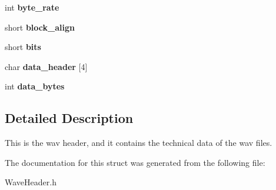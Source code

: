 \begin{DoxyCompactItemize}
\mbox{\label{structwav__header_a8330740d45200d6aee4ba54fc0d834d8}} 
int {\bfseries byte\+\_\+rate}
\item 
\mbox{\label{structwav__header_aacca1b77173a063cff26899c8fd614b7}} 
short {\bfseries block\+\_\+align}
\item 
\mbox{\label{structwav__header_a451eecf1447e3b099597004be44f43e3}} 
short {\bfseries bits}
\item 
\mbox{\label{structwav__header_ae43fac12459053e98a80e3879c5cd2a7}} 
char {\bfseries data\+\_\+header} \mbox{[}4\mbox{]}
\item 
\mbox{\label{structwav__header_a3eeeca270947eab7c7aaee61bbee9b0e}} 
int {\bfseries data\+\_\+bytes}
\end{DoxyCompactItemize}


\subsection{Detailed Description}
This is the wav header, and it contains the technical data of the wav files. 

The documentation for this struct was generated from the following file\+:\begin{DoxyCompactItemize}
\item 
Wave\+Header.\+h\end{DoxyCompactItemize}
